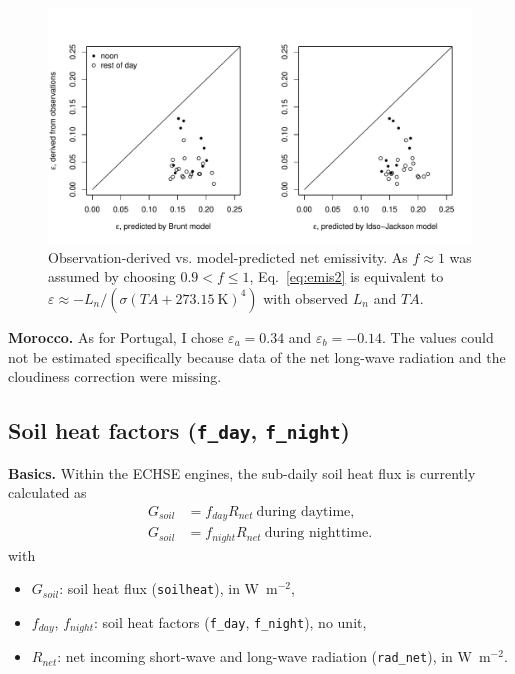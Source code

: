 \documentclass{scrreprt}
\newenvironment{denseitem}{
  \begin{itemize}
    \setlength{\itemsep}{0pt}
    \setlength{\parskip}{0pt}
    \setlength{\parsep}{0pt}
}{
  \end{itemize}
}
\begin{document}
\begin{figure}[ht]
  \centering
  \includegraphics[width=0.8\hsize]{./plot_emis_both.pdf}
  \caption{Observation-derived vs. model-predicted net emissivity.
           As $f \approx 1$ was assumed by choosing $0.9 < f \leq 1$, Eq.~\eqref{eq:emis2} is equivalent to $\varepsilon \approx - L_n / (\sigma (TA + 273.15~\text{K})^4)$ with observed $L_n$ and $TA$.}
  \label{fig:portugal_emis_both}
\end{figure}

\textbf{Morocco.}
As for Portugal, I chose $\varepsilon_a = 0.34$ and $\varepsilon_b = -0.14$.
The values could not be estimated specifically because data of the net long-wave radiation and the cloudiness correction were missing.

\subsection{Soil heat factors (\texttt{f\_day}, \texttt{f\_night})} \label{ssec:parest_rad_f}

\textbf{Basics.}
Within the ECHSE engines, the sub-daily soil heat flux is currently calculated as
\begin{align}
  G_{soil} &= f_{day} R_{net} ~ \text{during daytime}, \label{eq:f1} \\
  G_{soil} &= f_{night} R_{net} ~ \text{during nighttime}. \label{eq:f2}
\end{align}
%
with
\begin{denseitem}
  \item[] $G_{soil}$: soil heat flux (\verb!soilheat!), in W~m$^{-2}$,
  \item[] $f_{day}$, $f_{night}$: soil heat factors (\verb!f_day!, \verb!f_night!), no unit,
  \item[] $R_{net}$: net incoming short-wave and long-wave radiation (\verb!rad_net!), in W~m$^{-2}$.
\end{denseitem}
\end{document}
